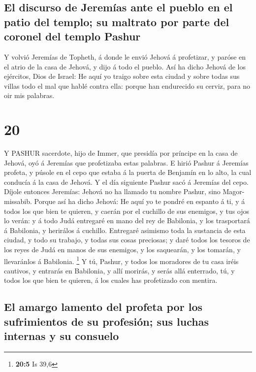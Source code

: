 \hypertarget{el-discurso-de-jeremuxedas-ante-el-pueblo-en-el-patio-del-templo-su-maltrato-por-parte-del-coronel-del-templo-pashur}{%
\subsection{El discurso de Jeremías ante el pueblo en el patio del
templo; su maltrato por parte del coronel del templo
Pashur}\label{el-discurso-de-jeremuxedas-ante-el-pueblo-en-el-patio-del-templo-su-maltrato-por-parte-del-coronel-del-templo-pashur}}

 Y volvió Jeremías de Topheth, á donde le envió Jehová á
profetizar, y paróse en el atrio de la casa de Jehová, y dijo á todo el
pueblo.  Así ha dicho Jehová de los ejércitos, Dios de
Israel: He aquí yo traigo sobre esta ciudad y sobre todas sus villas
todo el mal que hablé contra ella: porque han endurecido su cerviz, para
no oir mis palabras.

\hypertarget{section-19}{%
\section{20}\label{section-19}}

 Y PASHUR sacerdote, hijo de Immer, que presidía por
príncipe en la casa de Jehová, oyó á Jeremías que profetizaba estas
palabras.  E hirió Pashur á Jeremías profeta, y púsole en el
cepo que estaba á la puerta de Benjamín en lo alto, la cual conducía á
la casa de Jehová.  Y el día siguiente Pashur sacó á
Jeremías del cepo. Díjole entonces Jeremías: Jehová no ha llamado tu
nombre Pashur, sino Magor-missabib.  Porque así ha dicho
Jehová: He aquí yo te pondré en espanto á ti, y á todos los que bien te
quieren, y caerán por el cuchillo de sus enemigos, y tus ojos lo verán:
y á todo Judá entregaré en mano del rey de Babilonia, y los trasportará
á Babilonia, y herirálos á cuchillo.  Entregaré asimismo
toda la sustancia de esta ciudad, y todo su trabajo, y todas sus cosas
preciosas; y daré todos los tesoros de los reyes de Judá en manos de sus
enemigos, y los saquearán, y los tomarán, y llevaránlos á Babilonia.
\footnote{\textbf{20:5} Is 39,6}  Y tú, Pashur, y todos los
moradores de tu casa iréis cautivos, y entrarás en Babilonia, y allí
morirás, y serás allá enterrado, tú, y todos los que bien te quieren, á
los cuales has profetizado con mentira.

\hypertarget{el-amargo-lamento-del-profeta-por-los-sufrimientos-de-su-profesiuxf3n-sus-luchas-internas-y-su-consuelo}{%
\subsection{El amargo lamento del profeta por los sufrimientos de su
profesión; sus luchas internas y su
consuelo}\label{el-amargo-lamento-del-profeta-por-los-sufrimientos-de-su-profesiuxf3n-sus-luchas-internas-y-su-consuelo}}


